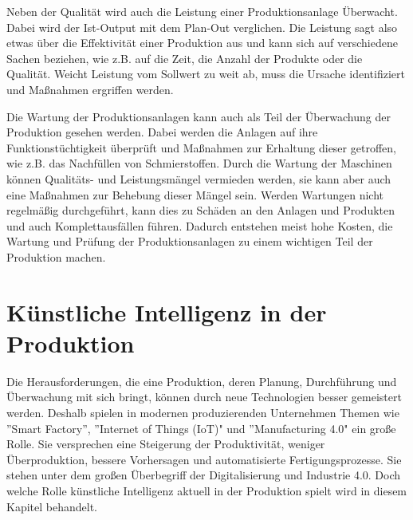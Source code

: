 \documentclass[a4paper,12pt, german]{report}
\begin{document}
Neben der Qualität wird auch die Leistung einer Produktionsanlage Überwacht. Dabei wird der Ist-Output mit dem Plan-Out verglichen. Die Leistung sagt also etwas über die Effektivität einer Produktion aus und kann sich auf verschiedene Sachen beziehen, wie z.B. auf die Zeit, die Anzahl der Produkte oder die Qualität. Weicht Leistung vom Sollwert zu weit ab, muss die Ursache identifiziert und Maßnahmen ergriffen werden. \cite{07}

Die Wartung der Produktionsanlagen kann auch als Teil der Überwachung der Produktion gesehen werden. Dabei werden die Anlagen auf ihre Funktionstüchtigkeit überprüft und Maßnahmen zur Erhaltung dieser getroffen, wie z.B. das Nachfüllen von Schmierstoffen. Durch die Wartung der Maschinen können Qualitäts- und Leistungsmängel vermieden werden, sie kann aber auch eine Maßnahmen zur Behebung dieser Mängel sein. Werden Wartungen nicht regelmäßig durchgeführt, kann dies zu Schäden an den Anlagen und Produkten und auch Komplettausfällen führen. Dadurch entstehen meist hohe Kosten, die Wartung und Prüfung der Produktionsanlagen zu einem wichtigen Teil der Produktion machen. \cite{07}





\chapter{Künstliche Intelligenz in der Produktion}
Die Herausforderungen, die eine Produktion, deren Planung, Durchführung und Überwachung mit sich bringt, können durch neue Technologien besser gemeistert werden. Deshalb spielen in modernen produzierenden Unternehmen Themen wie ''Smart Factory'', ''Internet of Things (IoT)" und ''Manufacturing 4.0" ein große Rolle. Sie versprechen eine Steigerung der Produktivität, weniger Überproduktion, bessere Vorhersagen und automatisierte Fertigungsprozesse. Sie stehen unter dem großen Überbegriff der Digitalisierung und Industrie 4.0. Doch welche Rolle künstliche Intelligenz aktuell in der Produktion spielt wird in diesem Kapitel behandelt.
\end{document}
